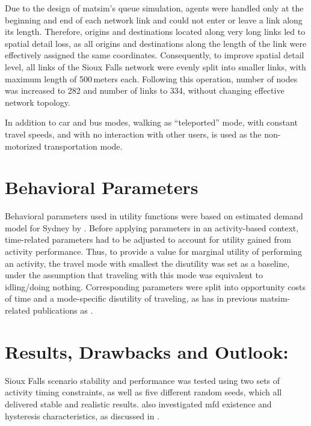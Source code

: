 Due to the design of \gls{matsim}’s queue simulation, agents were handled only at the beginning and end of each network link and could not enter or leave a link along its length. Therefore, origins and destinations located along very long links led to spatial detail loss, as all origins and destinations along the length of the link were effectively assigned the same coordinates. Consequently, to improve spatial detail level, all links of the Sioux Falls network were evenly split into smaller links, with maximum length of 500\,meters each. Following this operation, number of nodes was increased to 282 and number of links to 334, without changing effective network topology.

In addition to car and bus modes, walking as ``teleported'' mode, with constant travel speeds, and with no interaction with other users, is used as the non-motorized transportation mode. 

\section{Behavioral Parameters}
Behavioral parameters used in utility functions were based on estimated demand model for Sydney by \citet[][]{TirachiniHensherRose_TransResB_2014}. Before applying parameters in an activity-based context, time-related parameters had to be adjusted to account for utility gained from activity performance. Thus, to provide a value for marginal utility of performing an activity, the travel mode with smallest the disutility was set as a baseline, under the assumption that traveling with this mode was equivalent to idling/doing nothing. Corresponding parameters were split into opportunity costs of time and a mode-specific disutility of traveling, as has in previous \gls{matsim}-related publications as \citet[e.g,][]{KickhoeferEtAl_Transportation_2011}. 

\section{Results, Drawbacks and Outlook:}
Sioux Falls scenario stability and performance was tested using two sets of activity timing constraints, as well as five different random seeds, which all delivered stable and realistic results. \citet[][]{ChakirovFourie_TechRep_FCL_2014} also investigated \gls{mfd} existence and hysteresis characteristics, as discussed in \citet[][]{GeroliminisDaganzo_TRB_2007, GeroliminisDaganzo_TransResB_2008, GeroliminisSun_TransResA_2011}. 

